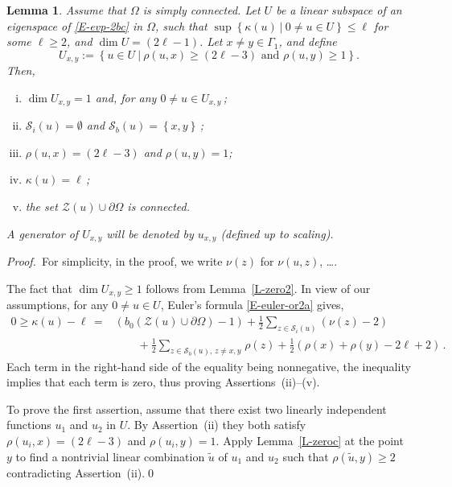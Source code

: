 \documentclass[12pt,a4paper]{amsart}
\theoremstyle{plain} %
\newtheorem{lemma}[theorem]{Lemma}
\theoremstyle{definition}
\numberwithin{equation}{section}
\numberwithin{figure}{section}
\numberwithin{table}{section}
\newcommand{\cS}{\mathcal{S}}
\newcommand{\cZ}{\mathcal{Z}}
\newcommand{\pf}{\emph{Proof.~}}
\newcommand{\set}[1]{\left\lbrace #1 \right\rbrace}
\begin{document}
{\begin{lemma}\label{L-Uxy0}
Assume that $\Omega$ is simply connected. Let $U$ be a linear subspace of an eigenspace of \eqref{E-evp-2bc} in $\Omega$,  such that $\sup\set{\kappa(u) ~|~ 0 \not = u \in U}\le \ell$ for some $\ell \ge 2$, and $\dim U = (2\ell-1)$. Let $x \neq y \in \Gamma_1$, and define
$$U_{x,y} := \set{u \in U ~|~ \rho(u,x) \ge (2\ell - 3) \text{~and~} \rho(u,y) \ge 1}.$$ Then,
\begin{enumerate}[(i)]
  \item $\dim U_{x,y} = 1$ and, for any $0 \neq u \in U_{x,y}$\,;
  \item %
            $\cS_i(u) = \emptyset$ and $\cS_b(u) = \set{x,y}$\,;
  \item $\rho(u,x)=(2\ell-3)$ and $\rho(u,y) = 1$;
  \item $\kappa(u) = \ell$\,;
  \item the set $\cZ(u) \cup \partial \Omega$ is connected.
\end{enumerate}
A generator of $U_{x,y}$ will be denoted by $u_{x,y}$ (defined up to scaling).
\end{lemma}%

\pf For simplicity, in the proof, we write $\nu(z)$ for $\nu(u,z)$, \ldots.\smallskip

The fact that $\dim U_{x,y} \ge 1$ follows from Lemma~\ref{L-zero2}.
In view of our assumptions, for any $0 \neq u \in U$, Euler's formula \eqref{E-euler-or2a} gives,
%
\begin{equation}\label{L-A5}
\begin{array}{ll}
0 \geq  \kappa(u) - \ell  \,  = &\left( b_0(\cZ(u) \cup \partial \Omega)-1\right)+ \frac 12 \sum_{z \in \cS_i(u)} (\nu(z)-2)\\[5pt] &\qquad +
\frac 12 \sum_{z\in \cS_b(u),\, z\neq x,y\,}\rho (z)  + \frac 12 \left( \rho(x) + \rho(y) -2\ell +2 \right)\,.
 \end{array}
\end{equation}
%
Each term in the right-hand side of the equality being nonnegative, the inequality implies that each term is zero, thus proving Assertions~(ii)--(v). \smallskip

To prove the first assertion, assume that there exist two linearly independent functions $u_1$ and $u_2$ in $U$. By Assertion~(ii) they both satisfy $\rho(u_i,x) = (2\ell - 3)$ and $\rho(u_i,y) = 1$. Apply Lemma~\ref{L-zeroc} at the point $y$ to find a nontrivial linear combination $\tilde u$ of $u_1$ and $u_2$ such that $\rho(\tilde u,y) \ge 2$ contradicting Assertion~(ii).\hfill \qed

}
\end{document}
